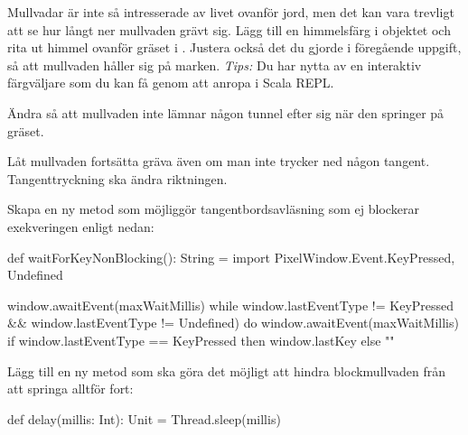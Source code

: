 \Task
Mullvadar är inte så intresserade av livet ovanför jord, men det kan vara trevligt att se hur långt ner mullvaden grävt sig.
Lägg till en himmelsfärg i objektet  och rita ut himmel ovanför gräset i .
Justera också det du gjorde i föregående uppgift, så att mullvaden håller sig på marken. \emph{Tips:} Du har nytta av en interaktiv färgväljare som du kan få genom att anropa  i Scala REPL.

\Task
Ändra så att mullvaden inte lämnar någon tunnel efter sig när den springer på gräset.

\Task
Låt mullvaden fortsätta gräva även om man inte trycker ned någon tangent. Tangenttryckning ska ändra riktningen.

\Subtask
Skapa en ny metod  som möjliggör tangentbordsavläsning som ej blockerar exekveringen enligt nedan:

\begin{Code}
  def waitForKeyNonBlocking(): String  = 
    import PixelWindow.Event.{KeyPressed, Undefined}

    window.awaitEvent(maxWaitMillis)
    while 
      window.lastEventType != KeyPressed  &&
      window.lastEventType != Undefined) 
    do window.awaitEvent(maxWaitMillis)
    if window.lastEventType == KeyPressed then window.lastKey else ""
\end{Code}

\Subtask
Lägg till en ny metod  som ska göra det möjligt att hindra blockmullvaden från att springa alltför fort:
\begin{Code}
  def delay(millis: Int): Unit = Thread.sleep(millis)
\end{Code}


